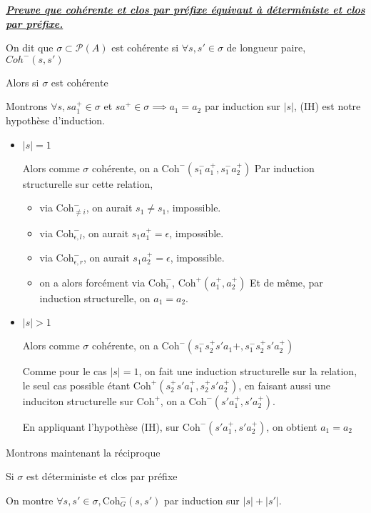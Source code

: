 \documentclass[a4paper,12ptCOUCOU
]{article}
\newlength{\mydepth}
\newlength{\myheight}
\newenvironment{answer}
{\par\begin{lrbox}{\mybox}\quad\begin{minipage}{\linewidth}\color{black}\setlength{\parskip}{10pt plus 1pt minus 1pt}\vspace*{-.7\baselineskip}}
{\end{minipage}\end{lrbox}
\settodepth{\mydepth}{\usebox{\mybox}}
\settoheight{\myheight}{\usebox{\mybox}}
\addtolength{\myheight}{\mydepth}
\noindent\makebox[0pt]{
  \color{gray}\hspace{-0pt}\rule[-\mydepth]{1pt}{\myheight}}
\usebox{\mybox}
  }
\begin{document}
\vspace{0.4cm}\begin{minipage}{\linewidth}\textbf{\textit{\underline{ Preuve que cohérente et clos par préfixe équivaut à déterministe et clos par préfixe. }}} \begin{answer}
On dit que $\sigma \subset \mathcal{P}(A)$ est cohérente si
$\forall s, s' \in \sigma$ de longueur paire, $ Coh^-(s,s')$

Alors si $\sigma$ est cohérente

Montrons $\forall s, sa_1^+ \in \sigma$ et $s a^+ \in \sigma \implies a_1 = a_2$
par induction sur $|s|$, (IH) est notre hypothèse d'induction.

\begin{itemize}
\item $|s| = 1$

Alors comme $\sigma$ cohérente, on a $\text{Coh}^-(s_1^-a_1^+,s_1^-a_2^+)$
Par induction structurelle sur cette relation,
\begin{itemize}
\item via $\text{Coh}^-_{\neq i}$, on aurait $s_1 \neq s_1$, impossible.
\item via $\text{Coh}^-_{\epsilon,l}$, on aurait $s_1a_1^+ = \epsilon$, impossible.
\item via $\text{Coh}^-_{\epsilon,r}$, on aurait $s_1a_2^+ = \epsilon$, impossible.
\item on a alors forcément via $\text{Coh}^-_i$, $\text{Coh}^+(a_1^+,a_2^+)$
Et de même, par induction structurelle, on $a_1 = a_2$.

\end{itemize}
\item $|s| > 1$

Alors comme $\sigma$ cohérente, on a $\text{Coh}^-(s_1^-s_2^+s'a_1+,s_1^-s_2^+s'a_2^+)$

Comme pour le cas $|s|=1$, on fait une induction structurelle sur la relation,
le seul cas possible étant $\text{Coh}^+(s_2^+s'a_1^+, s_2^+s'a_2^+)$,
en faisant aussi une induciton structurelle sur $\text{Coh}^+$,
on a $\text{Coh}^-(s'a_1^+, s'a_2^+)$.

En appliquant l'hypothèse (IH), sur $\text{Coh}^-(s'a_1^+,s'a_2^+)$, on
obtient $a_1 = a_2$

\end{itemize}

Montrons maintenant la réciproque

Si $\sigma$ est déterministe et clos par préfixe

On montre $\forall s, s' \in \sigma, \text{Coh}^-_G(s,s')$ par induction sur
$|s|+|s'|$.


\end{answer}
\end{minipage}
\end{document}
